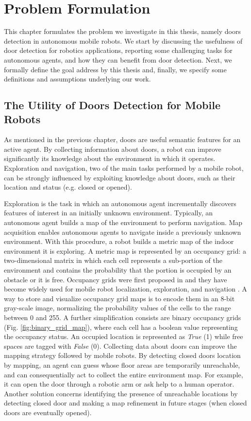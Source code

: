 \chapter{Problem Formulation}
\label{capitolo3}
\thispagestyle{empty}

This chapter formulates the problem we investigate in this thesis, namely doors detection in autonomous mobile robots. We start by discussing the usefulness of door detection for robotics applications, reporting some challenging tasks for autonomous agents, and how they can benefit from door detection. Next, we formally define the goal address by this thesis and, finally, we specify some definitions and assumptions underlying our work.

\section{The Utility of Doors Detection for Mobile Robots}

As mentioned in the previous chapter, doors are useful semantic features for an active agent. By collecting information about doors, a robot can improve significantly its knowledge about the environment in which it operates. Exploration and navigation, two of the main tasks performed by a mobile robot, can be strongly influenced by exploiting knowledge about doors, such as their location and status (e.g. closed or opened). 

Exploration is the task in which an autonomous agent incrementally discovers features of interest in an initially unknown environment. Typically, an autonomous agent builds a map of the environment to perform navigation.  Map acquisition enables autonomous agents to navigate inside a previously unknown environment. With this procedure, a robot builds a metric map of the indoor environment it is exploring. A metric map is represented by an occupancy grid: a two-dimensional matrix in which each cell represents a sub-portion of the environment and contains the probability that the portion is occupied by an obstacle or it is free. Occupancy grids were first proposed in \cite{cuupancygridfirst} and they have become widely used for mobile robot localization, exploration, and navigation \cite{gridmapnavigation, ariel, girdmapexploration}. A way to store and visualize occupancy grid maps is to encode them in an 8-bit gray-scale image, normalizing the probability values of the cells to the range between 0
and 255. A further simplification consists are binary occupancy grids (Fig. \ref{fig:binary_grid_map}), where each cell has a boolean value representing the occupancy status. An occupied location is represented as \textit{True} (1) while free spaces are tagged with \textit{False} (0). Collecting data about doors can improve the mapping strategy followed by mobile robots. By detecting closed doors location by mapping, an agent can guess whose floor areas are temporarily unreachable, and can consequentially act to collect the entire environment map. For example, it can open the door through a robotic arm \cite{doorcabinet} or ask help to a human operator. Another solution concerns identifying the presence of unreachable locations by detecting closed door and making a map refinement in future stages (when closed doors are eventually opened).

